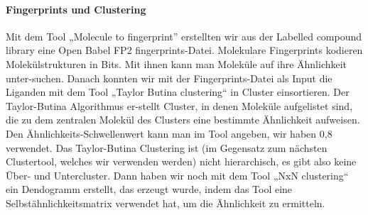 \documentclass[10pt]{article}
\begin{document}
{    \paragraph{Fingerprints und Clustering}
    Mit dem Tool „Molecule to fingerprint” erstellten wir aus der Labelled compound library eine Open Babel FP2 fingerprints-Datei. Molekulare Fingerprints kodieren Molekülstrukturen in Bits. Mit ihnen kann man Moleküle auf ihre Ähnlichkeit unter-suchen.
    Danach konnten wir mit der Fingerprints-Datei als Input die Liganden mit dem Tool „Taylor Butina clustering“ in Cluster einsortieren. Der Taylor-Butina Algorithmus er-stellt Cluster, in denen Moleküle aufgelistet sind, die zu dem zentralen Molekül des Clusters eine bestimmte Ähnlichkeit aufweisen. Den Ähnlichkeits-Schwellenwert kann man im Tool angeben, wir haben 0,8 verwendet. Das Taylor-Butina Clustering ist (im Gegensatz zum nächsten Clustertool, welches wir verwenden werden) nicht hierarchisch, es gibt also keine Über- und Untercluster.
    Dann haben wir noch mit dem Tool „NxN clustering“ ein Dendogramm erstellt, das erzeugt wurde, indem das Tool eine Selbstähnlichkeitsmatrix verwendet hat, um die Ähnlichkeit zu ermitteln.

}
\end{document}
